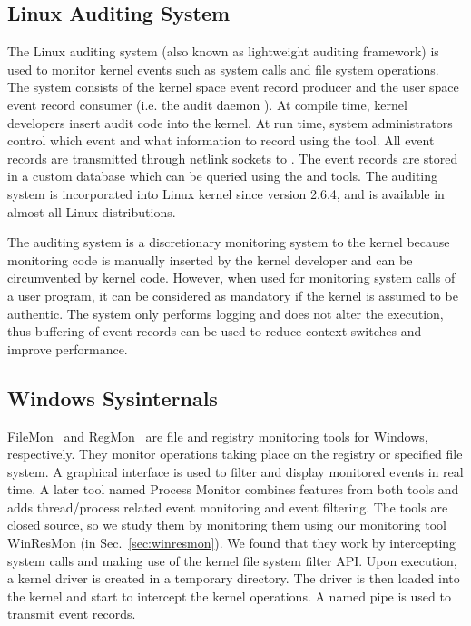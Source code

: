 \subsection{Linux Auditing System}
\label{sec:laudit}

The Linux auditing system (also known as lightweight auditing framework)
is used to monitor kernel events such as system calls and file system
operations.
The system consists of the kernel space event record producer and
the user space event record consumer (i.e. the audit daemon ).
At compile time,
kernel developers insert audit code into the kernel.
At run time, system administrators control which event and what information
to record using the  tool.
All event records are transmitted through netlink sockets to .
The event records are stored in a custom database which can be queried
using the  and  tools.
The auditing system is incorporated into Linux kernel since version 2.6.4,
and is available in almost all Linux distributions.

The auditing system is a discretionary monitoring system to the kernel because
monitoring code is manually inserted by the kernel developer and can
be circumvented by kernel code.
However, when used for monitoring system calls of a user program,
it can be considered as mandatory if the kernel is assumed to be authentic.
The system only performs logging and does not alter the execution,
thus buffering of event records can be used to reduce context switches
and improve performance.

\subsection{Windows Sysinternals}
\label{sec:sysinternals}

FileMon~\cite{filemon} and RegMon~\cite{regmon}
are file and registry monitoring tools for Windows, respectively.
They monitor operations taking place on
the registry or specified file system.
A graphical interface is used to filter and display monitored events in real time.
A later tool named Process Monitor combines features from both tools
and adds thread/process related event monitoring and event filtering.
The tools are closed source, so we study them by monitoring them
using our monitoring tool WinResMon (in Sec.~\ref{sec:winresmon}).
We found that they work by intercepting system calls and making
use of the kernel file system filter API.
Upon execution, a kernel driver is created in a temporary directory.
The driver is then loaded into the kernel and start to intercept
the kernel operations.
A named pipe is used to transmit event records.

